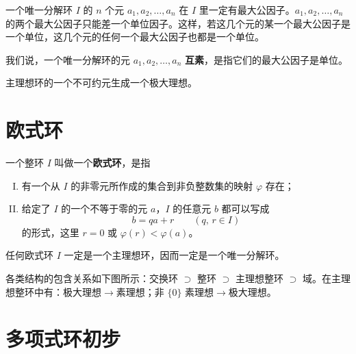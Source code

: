 \begin{corollary}
一个唯一分解环 $I$ 的 $n$ 个元 $a_1,a_2,\ldots,a_n$ 在 $I$ 里一定有最大公因子。$a_1,a_2,\ldots,a_n$ 的两个最大公因子只能差一个单位因子。这样，若这几个元的某一个最大公因子是一个单位，这几个元的任何一个最大公因子也都是一个单位。
\end{corollary}

\begin{definition}[互素]
我们说，一个唯一分解环的元 $a_1,a_2,\ldots,a_n$ \textbf{互素}，是指它们的最大公因子是单位。
\end{definition}

\begin{lemma}[引理 2：主理想环的不可约元生成极大理想]
主理想环的一个不可约元生成一个极大理想。
\end{lemma}

\section{欧式环}

\begin{definition}[欧式环]
一个整环 $I$ 叫做一个\textbf{欧式环}，是指
\begin{enumerate}[I.]
  \item 有一个从 $I$ 的非零元所作成的集合到非负整数集的映射 $\varphi$ 存在；
  \item 给定了 $I$ 的一个不等于零的元 $a$，$I$ 的任意元 $b$ 都可以写成
  \[
    b=qa+r\qquad(q,\,r\in I)
  \]
  的形式，这里 $r=0$ 或 $\varphi(r)<\varphi(a)$。
\end{enumerate}
\end{definition}

\begin{theorem}[定理 1：欧式环是主理想环]
任何欧式环 $I$ 一定是一个主理想环，因而一定是一个唯一分解环。
\end{theorem}

\begin{note}[环域主理想之间的关系]
各类结构的包含关系如下图所示：交换环 $\supset$ 整环 $\supset$ 主理想整环 $\supset$ 域。在主理想整环中有：极大理想$\to$素理想；非 $\{0\}$ 素理想$\to$极大理想。
\end{note}

\section{多项式环初步}


